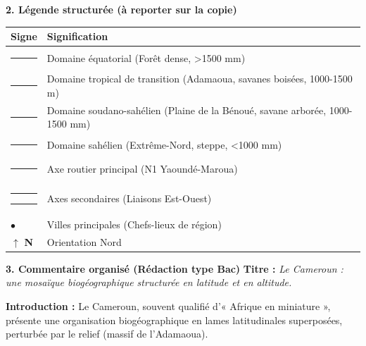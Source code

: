 \documentclass[11pt]{article}
\begin{document}
\begin{exoresolu}
\textbf{2. Légende structurée (à reporter sur la copie)}

\begin{center}
\begin{tabularx}{\linewidth}{|l|X|}\hline
\rowcolor{popblueL} \textbf{Signe} & \textbf{Signification} \\ \hline
\cellcolor{popgreen!60}\textcolor{white}{\rule{1cm}{4pt}} & Domaine équatorial (Forêt dense, >1500 mm) \\ \hline
\cellcolor{popgreen!30}\rule{1cm}{4pt} & Domaine tropical de transition (Adamaoua, savanes boisées, 1000-1500 m) \\ \hline
\cellcolor{popgold!40}\rule{1cm}{4pt} & Domaine soudano-sahélien (Plaine de la Bénoué, savane arborée, 1000-1500 mm) \\ \hline
\cellcolor{poporange!30}\rule{1cm}{4pt} & Domaine sahélien (Extrême-Nord, steppe, <1000 mm) \\ \hline
\textcolor{popblue}{\rule[2pt]{1cm}{3pt}} & Axe routier principal (N1 Yaoundé-Maroua) \\ \hline
\textcolor{popblue}{\rule[2pt]{1cm}{3pt}\rule[2pt]{1cm}{3pt}} & Axes secondaires (Liaisons Est-Ouest) \\ \hline
$\bullet$ & Villes principales (Chefs-lieux de région) \\ \hline
$\uparrow$ \textbf{N} & Orientation Nord \\ \hline
\end{tabularx}
\end{center}

\textbf{3. Commentaire organisé (Rédaction type Bac)}
\textbf{Titre :} \emph{Le Cameroun : une mosaïque biogéographique structurée en latitude et en altitude.}

\textbf{Introduction :} Le Cameroun, souvent qualifié d'« Afrique en miniature », présente une organisation biogéographique en lames latitudinales superposées, perturbée par le relief (massif de l'Adamaoua).


\end{exoresolu}
\end{document}
